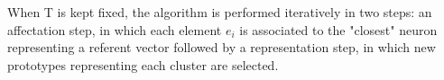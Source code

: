 \documentclass[10pt, conference, compsocconf]{IEEEtran}
\begin{document}
When T is kept fixed, the algorithm is performed iteratively in two steps: an affectation step, in which each element $e_i$ is associated to the "closest" neuron representing a referent vector followed by a representation step, in which new prototypes representing each cluster are selected.

%


%
\end{document}
